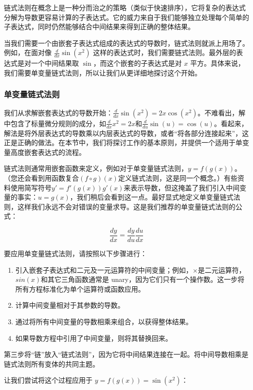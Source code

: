 \documentclass[11pt]{article}
\begin{document}
链式法则在概念上是一种分而治之的策略（类似于快速排序），它将复杂的表达式分解为导数更容易计算的子表达式。它的威力来自于我们能够独立处理每个简单的子表达式，同时仍然能够结合中间结果来得到正确的整体结果。

当我们需要一个由嵌套子表达式组成的表达式的导数时，链式法则就派上用场了。例如，在面对像 $\frac{d}{dx} \sin(x^2)$ 这样的表达式时，我们需要链式法则。最外层的表达式是对一个中间结果取 $\sin$，而这个嵌套的子表达式是对 $x$ 平方。具体来说，我们需要单变量链式法则，所以让我们从更详细地探讨这个开始。


\subsubsection{单变量链式法则}\label{sec4.5.1}

我们从求解嵌套表达式的导数开始：$\frac{d}{dx} \sin(x^2) = 2x\cos(x^2)$。不难看出，解中包含了标量微分规则的成分，如$\frac{d}{dx}x^2 = 2x$和$\frac{d}{du} \sin(u) = \cos(u)$。看起来，解法是将外层表达式的导数乘以内层表达式的导数，或者“将各部分连接起来”，这正是正确的做法。在本节中，我们将探讨工作的基本原则，并提供一个适用于单变量高度嵌套表达式的流程。

链式法则通常用嵌套函数来定义，例如对于单变量链式法则，$y = f(g(x))$。 （您还会看到用函数复合$(f \circ g)(x)$定义链式法则，这是同一个概念。）有些资料使用简写符号$y' = f'(g(x))g'(x)$来表示导数，但这掩盖了我们引入中间变量的事实：$u = g(x)$，我们稍后会看到这一点。最好显式地定义单变量链式法则，这样我们永远不会对错误的变量求导。这是我们推荐的单变量链式法则的公式：

\[
\frac{dy}{dx} = \frac{dy}{du}\frac{du}{dx}
\]

要应用单变量链式法则，请按照以下步骤进行：

\begin{enumerate}
\item 引入嵌套子表达式和二元及一元运算符的中间变量；例如，$\times$是二元运算符，$sin(x)$和其它三角函数通常是 unary，因为它们只有一个操作数。这一步将所有方程标准化为单个运算符或函数应用。
\item 计算中间变量相对于其参数的导数。
\item 通过将所有中间变量的导数相乘来组合，以获得整体结果。
\item 如果导数方程中引用了中间变量，则将其替换回来。
\end{enumerate}

第三步将“链”放入“链式法则”，因为它将中间结果连接在一起。将中间导数相乘是链式法则所有变体的共同主题。

让我们尝试将这个过程应用于 $y = f(g(x)) = \sin(x^2)$：
\end{document}
